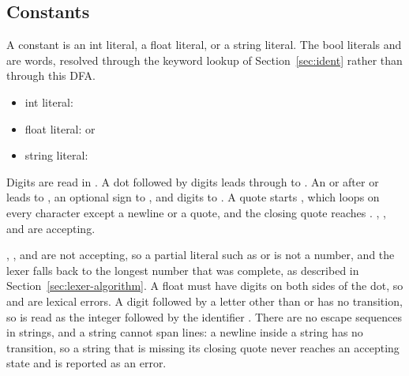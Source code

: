 \subsection{Constants}

A constant is an int literal, a float literal, or a string literal. The bool
literals  and  are words, resolved through the
keyword lookup of Section~\ref{sec:ident} rather than through this DFA.

\begin{itemize}
    \item int literal: \code{[0-9]+}
    \item float literal:  or
    \item string literal: 
\end{itemize}

Digits are read in . A dot followed by digits leads through
 to . An  or  after  or
 leads to , an optional sign to , and
digits to . A quote starts , which loops on
every character except a newline or a quote, and the closing quote reaches
. , ,  and
 are accepting.

, , and  are not accepting, so a
partial literal such as  or  is not a number, and the lexer
falls back to the longest number that was complete, as described in
Section~\ref{sec:lexer-algorithm}. A float must have digits on both sides of
the dot, so  and  are lexical errors. A digit followed by a
letter other than  or  has no transition, so  is
read as the integer  followed by the identifier . There
are no escape sequences in strings, and a string cannot span lines: a newline
inside a string has no transition, so a string that is missing its closing
quote never reaches an accepting state and is reported as an error.

